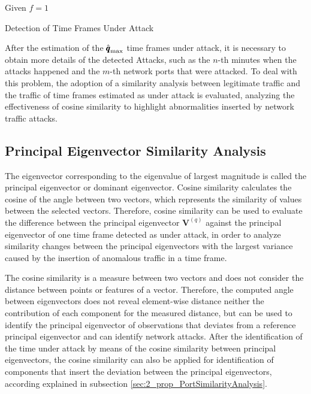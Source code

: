 \begin{algorithm}
	\label{alg:2.01}
	\SetAlgoLined
	Given $f = 1$\;
	\caption{Detection of Time Frames Under Attack}
\end{algorithm}

After the estimation of the $\rm{\hat{\pmb{q}}}_{\rm max}$ time frames under attack, it is necessary to obtain more details of the detected Attacks, such as the $n$-th minutes when the attacks happened and the $m$-th network ports that were attacked. To deal with this problem, the adoption of a similarity analysis between legitimate traffic and the traffic of time frames estimated as under attack is evaluated, analyzing the effectiveness of cosine similarity to highlight abnormalities inserted by network traffic attacks. 

\subsection{Principal Eigenvector Similarity Analysis}
\label{sec:2_prop_EigensimilarityAnalysis}

The eigenvector corresponding to the eigenvalue of largest magnitude is called the principal eigenvector or dominant eigenvector. Cosine similarity calculates the cosine of the angle between two vectors, which represents the similarity of values between the selected vectors. Therefore, cosine similarity can be used to evaluate the difference between the principal eigenvector $\pmb{V}^{(q)}$ against the principal eigenvector of one time frame detected as under attack, in order to analyze similarity changes between the principal eigenvectors with the largest variance caused by the insertion of anomalous traffic \cite{Lee2013} in a time frame.

The cosine similarity is a measure between two vectors and does not consider the distance between points or features of a vector. Therefore, the computed angle between eigenvectors does not reveal element-wise distance neither the contribution of each component for the measured distance, but can be used to identify the principal eigenvector of observations that deviates from a reference principal eigenvector and can identify network attacks. After the identification of the time under attack by means of the cosine similarity between principal eigenvectors, the cosine similarity can also be applied for identification of components that insert the deviation between the principal eigenvectors, according explained in subsection \ref{sec:2_prop_PortSimilarityAnalysis}.

